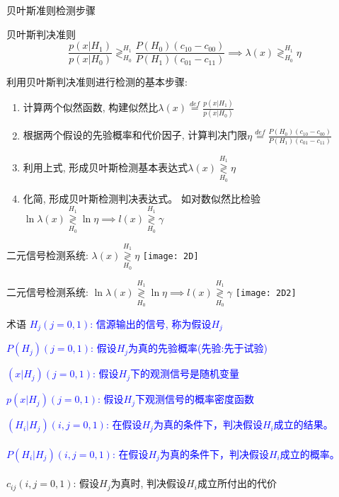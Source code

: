 \begin{frame}{贝叶斯准则检测步骤}
\begin{block}{贝叶斯判决准则}
	\[ \frac{p(x|H_1)}{p(x|H_0)}\mathop{\gtrless}_{H_0}^{H_1}\frac{P(H_0)(c_{10}-c_{00})}{P(H_1)(c_{01}-c_{11})} \implies \lambda(x)\mathop{\gtrless}_{H_0}^{H_1}\eta \]
\end{block}
利用贝叶斯判决准则进行检测的基本步骤:
\begin{enumerate}
	\item 计算两个似然函数, 构建似然比$\lambda(x)\mathop{=}\limits^{def}\frac{p(x|H_1)}{p(x|H_0)}$
	\item 根据两个假设的先验概率和代价因子, 计算判决门限$\eta\mathop{=}\limits^{def}\frac{P(H_0)(c_{10}-c_{00})}{P(H_1)(c_{01}-c_{11})}$
	\item 利用上式, 形成贝叶斯检测基本表达式$\lambda(x)\mathop{\gtrless}\limits_{H_0}^{H_1}\eta$
	\item 化简, 形成贝叶斯检测判决表达式。 如对数似然比检验$\ln\lambda(x)\mathop{\gtrless}\limits_{H_0}^{H_1}\ln\eta\implies l(x)\mathop{\gtrless}\limits_{H_0}^{H_1}\gamma$
\end{enumerate}
\end{frame}

\begin{frame}{二元信号检测系统: $\lambda(x)\mathop{\gtrless}\limits_{H_0}^{H_1}\eta$}
\centering
\texttt{[image: 2D]}
\end{frame}

\begin{frame}{二元信号检测系统: $\ln\lambda(x)\mathop{\gtrless}\limits_{H_0}^{H_1}\ln\eta\implies l(x)\mathop{\gtrless}\limits_{H_0}^{H_1}\gamma$}
\centering
\texttt{[image: 2D2]}
\end{frame}

\begin{frame}{术语}
\textcolor{blue}{$H_j(j=0,1)$: 信源输出的信号, 称为假设$H_j$}

\bigskip

\textcolor{blue}{$P(H_j)(j=0,1)$: 假设$H_j$为真的先验概率(先验:先于试验)}


\bigskip
\textcolor{blue}{$(x|H_j)(j=0,1)$: 假设$H_j$下的观测信号是随机变量}

\bigskip

\textcolor{blue}{$p(x|H_j)(j=0,1)$: 假设$H_j$下观测信号的概率密度函数}

\bigskip

\textcolor{blue}{$(H_i|H_j)(i,j=0,1)$: 在假设$H_j$为真的条件下，判决假设$H_i$成立的结果。}\\
~\\
\textcolor{blue}{$P(H_i|H_j)(i,j=0,1)$: 在假设$H_j$为真的条件下，判决假设$H_i$成立的概率。}\\
~\\
$c_{ij}(i,j=0,1)$: 假设$H_j$为真时, 判决假设$H_i$成立所付出的代价
\end{frame}

